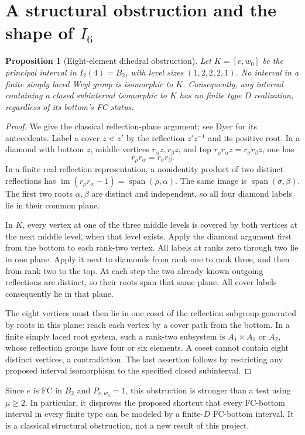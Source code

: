 \documentclass[11pt]{article}
\newtheorem{proposition}[theorem]{Proposition}
\theoremstyle{definition}\newtheorem{definition}[theorem]{Definition}
\theoremstyle{remark}\newtheorem{remark}[theorem]{Remark}
\begin{document}
\section{A structural obstruction and the shape of \texorpdfstring{$I_6$}{I6}}
\begin{proposition}[Eight-element dihedral obstruction]\label{prop:butterfly}
Let $K=[e,w_0]$ be the principal interval in $I_2(4)=B_2$,
with level sizes $(1,2,2,2,1)$. No interval in a finite simply
laced Weyl group is isomorphic to $K$. Consequently, any interval
containing a closed subinterval isomorphic to $K$ has no finite
type $D$ realization, regardless of its bottom's FC status.
\end{proposition}
\begin{proof}
We give the classical reflection-plane argument; see Dyer
\cite[Lemma 3.1 and Section 3.4]{dyer} for its antecedents.
Label a cover $z\lessdot z'$ by the reflection $z'z^{-1}$ and its
positive root. In a diamond with bottom $z$, middle vertices
$r_\alpha z,r_\beta z$, and top
$r_\rho r_\alpha z=r_\sigma r_\beta z$, one has
\[
 r_\rho r_\alpha=r_\sigma r_\beta.
\]
In a finite real reflection representation, a nonidentity product
of two distinct reflections has
$\operatorname{im}(r_\rho r_\alpha-1)=\operatorname{span}(\rho,\alpha)$.
The same image is $\operatorname{span}(\sigma,\beta)$.
The first two roots $\alpha,\beta$ are distinct and independent, so
all four diamond labels lie in their common plane.

In $K$, every vertex at one of the three middle levels is covered
by both vertices at the next middle level, when that level exists.
Apply the diamond argument first from the bottom to each rank-two
vertex. All labels at ranks zero through two lie in one plane.
Apply it next to diamonds from rank one to rank three, and then
from rank two to the top. At each step the two already known
outgoing reflections are distinct, so their roots span that same
plane. All cover labels consequently lie in that plane.

The eight vertices must then lie in one coset of the reflection
subgroup generated by roots in this plane: reach each vertex by a
cover path from the bottom. In a finite simply laced root system,
such a rank-two subsystem is $A_1\times A_1$ or $A_2$, whose
reflection groups have four or six elements. A coset cannot contain
eight distinct vertices, a contradiction.
The last assertion follows by restricting any proposed interval
isomorphism to the specified closed subinterval.
\end{proof}
Since $e$ is FC in $B_2$ and $P_{e,w_0}=1$, this obstruction is
stronger than a test using $\mu\geq2$. In particular, it disproves
the proposed shortcut that every FC-bottom interval in every finite
type can be modeled by a finite-$D$ FC-bottom interval. It is a
classical structural obstruction, not a new result of this project.
\end{document}
